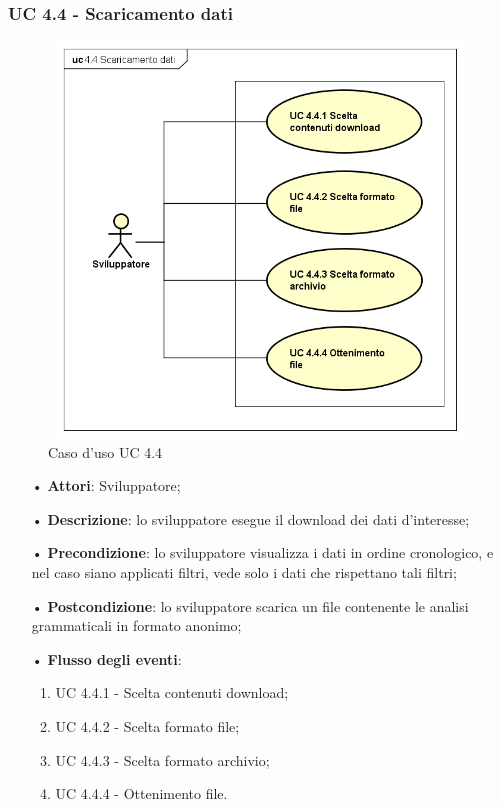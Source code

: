 \subsubsection{UC 4.4 - Scaricamento dati}
\begin{figure}[H]
\centering
\includegraphics[width=17cm, height=10.5cm]{img/UC440.png} 
\caption{Caso d'uso UC 4.4}\label{fig:440}
\end{figure}
\begin{itemize}
\item[•]\textbf{Attori}: Sviluppatore;
\item[•]\textbf{Descrizione}: lo sviluppatore esegue il download dei dati d'interesse;
\item[•]\textbf{Precondizione}: lo sviluppatore visualizza i dati in ordine cronologico, e nel caso siano applicati filtri, vede solo i dati che rispettano tali filtri;
\item[•]\textbf{Postcondizione}: lo sviluppatore scarica un file contenente le analisi grammaticali in formato anonimo;
\item[•]\textbf{Flusso degli eventi}:
\begin{enumerate}
\item UC 4.4.1 - Scelta contenuti download;
\item UC 4.4.2 - Scelta formato file;
\item UC 4.4.3 - Scelta formato archivio;
\item UC 4.4.4 - Ottenimento file.
\end{enumerate}
\end{itemize}

